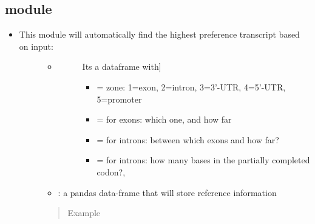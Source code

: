 \documentclass[letterpaper,10pt,english]{sphinxmanual}
\begin{document}
\subsection{ module}
\label{\detokenize{iAnnotateSV:findatranscript-module}}\begin{itemize}
\item {} \begin{description}
\item[{This module will automatically find the highest preference transcript based on input:}] \leavevmode\begin{itemize}
\item {} \begin{description}
\item[{}] \leavevmode{[}Its a dataframe with{]}\begin{itemize}
\item {} 
 = zone: 1=exon, 2=intron, 3=3’-UTR, 4=5’-UTR, 5=promoter

\item {} 
 = for exons: which one, and how far

\item {} 
 = for introns: between which exons and how far?

\item {} 
 = for introns: how many bases in the partially completed codon?,

\end{itemize}

\end{description}

\item {} 
 : a pandas data-frame that will store reference information

\end{itemize}
\begin{quote}\begin{description}
\item[{Example}] \leavevmode
{}

\end{description}\end{quote}

\end{description}

\end{itemize}
\end{document}
